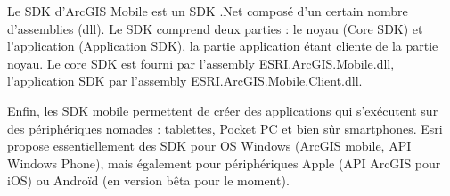 \documentclass[11pt]{article}
\begin{document}
Le SDK d’ArcGIS Mobile est un SDK .Net composé d’un certain nombre d’assemblies (dll). Le SDK comprend deux parties : le noyau (Core SDK) et l’application (Application SDK), la partie application étant cliente de la partie noyau. Le core SDK est fourni par l’assembly ESRI.ArcGIS.Mobile.dll, l’application SDK par l’assembly ESRI.ArcGIS.Mobile.Client.dll.

Enfin, les SDK mobile permettent de créer des applications qui s’exécutent sur des périphériques nomades : tablettes, Pocket PC et bien sûr smartphones. Esri propose essentiellement des SDK pour OS Windows (ArcGIS mobile, API Windows Phone), mais également pour périphériques Apple (API ArcGIS pour iOS) ou Androïd (en version bêta pour le moment).

 
\end{document}
